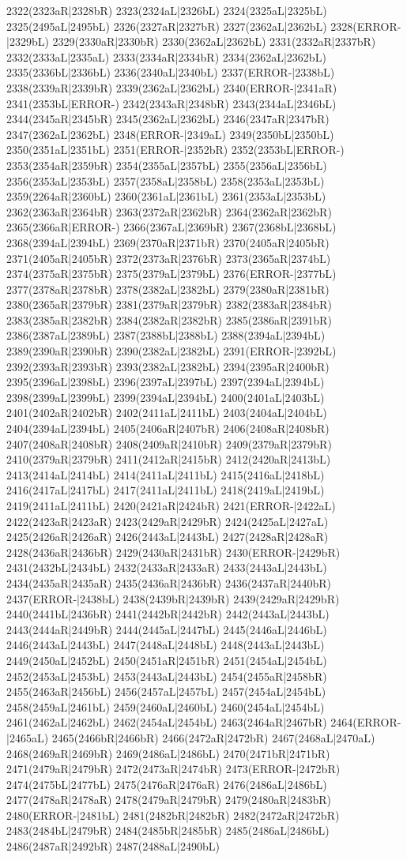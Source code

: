2322(2323aR|2328bR) 2323(2324aL|2326bL) 2324(2325aL|2325bL) 2325(2495aL|2495bL) 2326(2327aR|2327bR) 2327(2362aL|2362bL) 2328(ERROR-|2329bL) 2329(2330aR|2330bR) 2330(2362aL|2362bL) 2331(2332aR|2337bR) 2332(2333aL|2335aL) 2333(2334aR|2334bR) 2334(2362aL|2362bL) 2335(2336bL|2336bL) 2336(2340aL|2340bL) 2337(ERROR-|2338bL) 2338(2339aR|2339bR) 2339(2362aL|2362bL) 2340(ERROR-|2341aR) 2341(2353bL|ERROR-) 2342(2343aR|2348bR) 2343(2344aL|2346bL) 2344(2345aR|2345bR) 2345(2362aL|2362bL) 2346(2347aR|2347bR) 2347(2362aL|2362bL) 2348(ERROR-|2349aL) 2349(2350bL|2350bL) 2350(2351aL|2351bL) 2351(ERROR-|2352bR) 2352(2353bL|ERROR-) 2353(2354aR|2359bR) 2354(2355aL|2357bL) 2355(2356aL|2356bL) 2356(2353aL|2353bL) 2357(2358aL|2358bL) 2358(2353aL|2353bL) 2359(2264aR|2360bL) 2360(2361aL|2361bL) 2361(2353aL|2353bL) 2362(2363aR|2364bR) 2363(2372aR|2362bR) 2364(2362aR|2362bR) 2365(2366aR|ERROR-) 2366(2367aL|2369bR) 2367(2368bL|2368bL) 2368(2394aL|2394bL) 2369(2370aR|2371bR) 2370(2405aR|2405bR) 2371(2405aR|2405bR) 2372(2373aR|2376bR) 2373(2365aR|2374bL) 2374(2375aR|2375bR) 2375(2379aL|2379bL) 2376(ERROR-|2377bL) 2377(2378aR|2378bR) 2378(2382aL|2382bL) 2379(2380aR|2381bR) 2380(2365aR|2379bR) 2381(2379aR|2379bR) 2382(2383aR|2384bR) 2383(2385aR|2382bR) 2384(2382aR|2382bR) 2385(2386aR|2391bR) 2386(2387aL|2389bL) 2387(2388bL|2388bL) 2388(2394aL|2394bL) 2389(2390aR|2390bR) 2390(2382aL|2382bL) 2391(ERROR-|2392bL) 2392(2393aR|2393bR) 2393(2382aL|2382bL) 2394(2395aR|2400bR) 2395(2396aL|2398bL) 2396(2397aL|2397bL) 2397(2394aL|2394bL) 2398(2399aL|2399bL) 2399(2394aL|2394bL) 2400(2401aL|2403bL) 2401(2402aR|2402bR) 2402(2411aL|2411bL) 2403(2404aL|2404bL) 2404(2394aL|2394bL) 2405(2406aR|2407bR) 2406(2408aR|2408bR) 2407(2408aR|2408bR) 2408(2409aR|2410bR) 2409(2379aR|2379bR) 2410(2379aR|2379bR) 2411(2412aR|2415bR) 2412(2420aR|2413bL) 2413(2414aL|2414bL) 2414(2411aL|2411bL) 2415(2416aL|2418bL) 2416(2417aL|2417bL) 2417(2411aL|2411bL) 2418(2419aL|2419bL) 2419(2411aL|2411bL) 2420(2421aR|2424bR) 2421(ERROR-|2422aL) 2422(2423aR|2423aR) 2423(2429aR|2429bR) 2424(2425aL|2427aL) 2425(2426aR|2426aR) 2426(2443aL|2443bL) 2427(2428aR|2428aR) 2428(2436aR|2436bR) 2429(2430aR|2431bR) 2430(ERROR-|2429bR) 2431(2432bL|2434bL) 2432(2433aR|2433aR) 2433(2443aL|2443bL) 2434(2435aR|2435aR) 2435(2436aR|2436bR) 2436(2437aR|2440bR) 2437(ERROR-|2438bL) 2438(2439bR|2439bR) 2439(2429aR|2429bR) 2440(2441bL|2436bR) 2441(2442bR|2442bR) 2442(2443aL|2443bL) 2443(2444aR|2449bR) 2444(2445aL|2447bL) 2445(2446aL|2446bL) 2446(2443aL|2443bL) 2447(2448aL|2448bL) 2448(2443aL|2443bL) 2449(2450aL|2452bL) 2450(2451aR|2451bR) 2451(2454aL|2454bL) 2452(2453aL|2453bL) 2453(2443aL|2443bL) 2454(2455aR|2458bR) 2455(2463aR|2456bL) 2456(2457aL|2457bL) 2457(2454aL|2454bL) 2458(2459aL|2461bL) 2459(2460aL|2460bL) 2460(2454aL|2454bL) 2461(2462aL|2462bL) 2462(2454aL|2454bL) 2463(2464aR|2467bR) 2464(ERROR-|2465aL) 2465(2466bR|2466bR) 2466(2472aR|2472bR) 2467(2468aL|2470aL) 2468(2469aR|2469bR) 2469(2486aL|2486bL) 2470(2471bR|2471bR) 2471(2479aR|2479bR) 2472(2473aR|2474bR) 2473(ERROR-|2472bR) 2474(2475bL|2477bL) 2475(2476aR|2476aR) 2476(2486aL|2486bL) 2477(2478aR|2478aR) 2478(2479aR|2479bR) 2479(2480aR|2483bR) 2480(ERROR-|2481bL) 2481(2482bR|2482bR) 2482(2472aR|2472bR) 2483(2484bL|2479bR) 2484(2485bR|2485bR) 2485(2486aL|2486bL) 2486(2487aR|2492bR) 2487(2488aL|2490bL) 